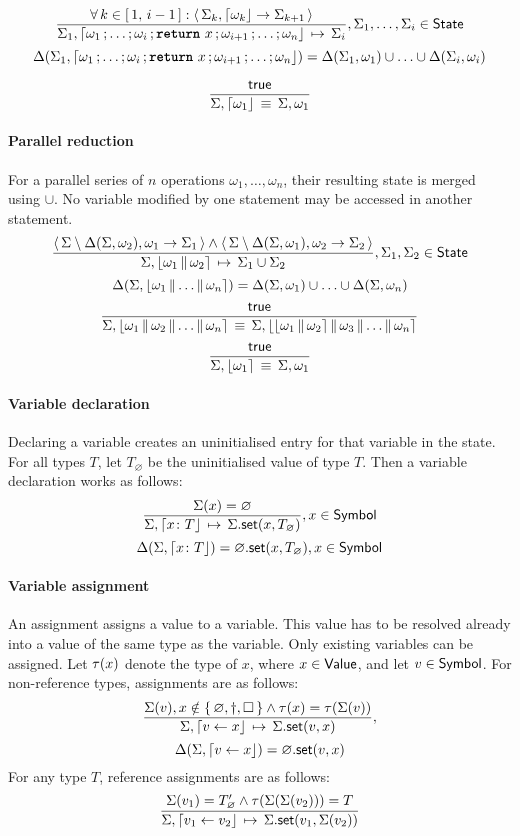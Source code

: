 $$
\semrule{
	\forall\, k \in \range{1}{i-1}: \results{\Sigma_k}{\stmt{\omega_k}}{\Sigma_{k+1}}}
	{\Sigma_1, \stmt{\omega_1}{\ldots}{\omega_i}{\retstmt{x}}{\omega_{i+1}}{\ldots}{\omega_n}}
	{\Sigma_i},
	\Sigma_1, \ldots, \Sigma_i \in \State
$$
$$
	\Delta(\Sigma_1, \stmt{\omega_1}{\ldots}{\omega_i}{\retstmt{x}}{\omega_{i+1}}{\ldots}{\omega_n}) =
		\Delta(\Sigma_1, \omega_1) \cup \ldots \cup \Delta(\Sigma_i, \omega_i)
$$

$$
\semruleeq{\true}
	{\Sigma, \stmt{\omega_1}}
	{\Sigma, \omega_1}
$$

\paragraph{Parallel reduction}
For a parallel series of $n$ operations $\omega_1, \ldots, \omega_n$, their resulting state is merged using $\cup$.
No variable modified by one statement may be accessed in another statement.
$$
	\semrule{
		\results{\Sigma \setminus \Delta(\Sigma, \omega_2)}{\omega_1}{\Sigma_1} \land
		\results{\Sigma \setminus \Delta(\Sigma, \omega_1)}{\omega_2}{\Sigma_2}}
		{\Sigma, \parstmt{\omega_1}{\omega_2}}
		{\Sigma_1 \cup \Sigma_2},
			\Sigma_1, \Sigma_2 \in \State
$$
$$
	\Delta(\Sigma, \parstmt{\omega_1}{\ldots}{\omega_n}) = \Delta(\Sigma, \omega_1) \cup \ldots \cup \Delta(\Sigma, \omega_n)
$$
$$
	\semruleeq{\true}
		{\Sigma, \parstmt{\omega_1}{\omega_2}{\ldots}{\omega_n}}
		{\Sigma, \parstmt{\parstmt{\omega_1}{\omega_2}}{\omega_3}{\ldots}{\omega_n}}
$$
$$
\semruleeq{\true}
	{\Sigma, \parstmt{\omega_1}}
	{\Sigma, \omega_1}
$$

\paragraph{Variable declaration}
Declaring a variable creates an uninitialised entry for that variable in the state.
For all types $T$, let $T_\varnothing$ be the uninitialised value of type $T$.
Then a variable declaration works as follows:
$$
\semrule
	{\Sigma(x) = \varnothing}
	{\Sigma, \stmt{\varv{x}{T}}}
	{\StSet{\Sigma}{x}{T_\varnothing}},
		x \in \Symbol
$$
$$
\Delta(\Sigma, \stmt{\varv{x}{T}}) = \StSet{\varnothing}{x}{T_\varnothing},
                x \in \Symbol
$$

\paragraph{Variable assignment}
An assignment assigns a value to a variable.
This value has to be resolved already into a value of the same type as the variable.
Only existing variables can be assigned.
Let $\tau(x)$ denote the type of $x$, where $x \in \mathsf{Value}$, and let $v \in \mathsf{Symbol}$.
For non-reference types, assignments are as follows:
$$
\semrule
	{\Sigma(v), x \notin \set{\varnothing, \dagger, \Box} \land
		\typeof{x} = \typeof{\Sigma(v)}}
	{\Sigma, \stmt{v \gets x}}
	{\StSet{\Sigma}{v}{x}},
$$
$$
\Delta(\Sigma, \stmt{v \gets x}) = \StSet{\varnothing}{v}{x}
$$
For any type $T$, reference assignments are as follows:
$$
\semrule
	{\Sigma(v_1) = \reft{T}_\varnothing \land
		\typeof{\Sigma(\Sigma(v_2))} = T}
	{\Sigma, \stmt{v_1 \gets v_2}}
	{\StSet{\Sigma}{v_1}{\Sigma(v_2)}}
$$

